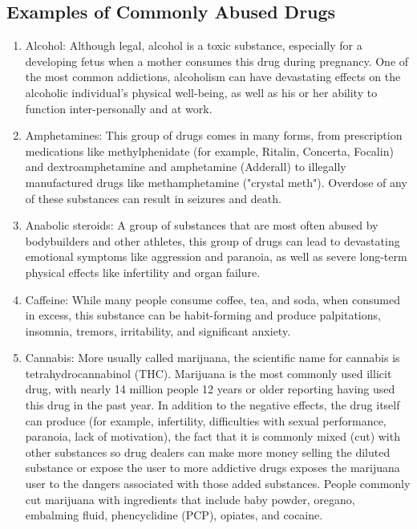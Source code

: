 \documentclass{report}
\begin{document}
\subsection{Examples of Commonly Abused Drugs}
\begin{enumerate}
    \item Alcohol: Although legal, alcohol is a toxic substance, especially for a developing fetus when a mother consumes this drug during pregnancy. One of the most common addictions, alcoholism can have devastating effects on the alcoholic individual's physical well-being, as well as his or her ability to function inter-personally and at work.
    
    \item Amphetamines: This group of drugs comes in many forms, from prescription medications like methylphenidate (for example, Ritalin, Concerta, Focalin) and dextroamphetamine and amphetamine (Adderall) to illegally manufactured drugs like methamphetamine ("crystal meth"). Overdose of any of these substances can result in seizures and death.
    
    \item Anabolic steroids: A group of substances that are most often abused by bodybuilders and other athletes, this group of drugs can lead to devastating emotional symptoms like aggression and paranoia, as well as severe long-term physical effects like infertility and organ failure.
    
    \item Caffeine: While many people consume coffee, tea, and soda, when consumed in excess, this substance can be habit-forming and produce palpitations, insomnia, tremors, irritability, and significant anxiety.
    
    \item Cannabis: More usually called marijuana, the scientific name for cannabis is tetrahydrocannabinol (THC). Marijuana is the most commonly used illicit drug, with nearly 14 million people 12 years or older reporting having used this drug in the past year. In addition to the negative effects, the drug itself can produce (for example, infertility, difficulties with sexual performance, paranoia, lack of motivation), the fact that it is commonly mixed (cut) with other substances so drug dealers can make more money selling the diluted substance or expose the user to more addictive drugs exposes the marijuana user to the dangers associated with those added substances. People commonly cut marijuana with ingredients that include baby powder, oregano, embalming fluid, phencyclidine (PCP), opiates, and cocaine.
    

\end{enumerate}
\end{document}
